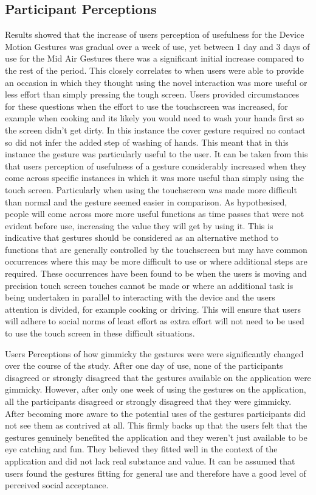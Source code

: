 \documentclass{l4proj}
\begin{document}
\subsection{Participant Perceptions}

Results showed that the increase of users perception of usefulness for the Device Motion Gestures was gradual over a week of use, yet between 1 day and 3 days of use for the Mid Air Gestures there was a significant initial increase compared to the rest of the period. This closely correlates to when users were able to provide an occasion in which they thought using the novel interaction was more useful or less effort than simply pressing the tough screen. Users provided circumstances for these questions when the effort to use the touchscreen was increased, for example when cooking and its likely you would need to wash your hands first so the screen didn't get dirty. In this instance the cover gesture required no contact so did not infer the added step of washing of hands. This meant that in this instance the gesture was particularly useful to the user. It can be taken from this that users perception of usefulness of a gesture considerably increased when they come across specific instances in which it was more useful than simply using the touch screen. Particularly when using the touchscreen was made more difficult than normal and the gesture seemed easier in comparison. As hypothesised, people will come across more more useful functions as time passes that were not evident before use, increasing the value they will get by using it. This is indicative that gestures should be considered as an alternative method to functions that are generally controlled by the touchscreen but may have common occurrences where this may be more difficult to use or where additional steps are required. These occurrences have been found to be when the users is moving and precision touch screen touches cannot be made or where an additional task is being undertaken in parallel to interacting with the device and the users attention is divided, for example cooking or driving. This will ensure that users will adhere to social norms of least effort as extra effort will not need to be used to use the touch screen in these difficult situations.

Users Perceptions of how gimmicky the gestures were were significantly changed over the course of the study. After one day of use, none of the participants disagreed or strongly disagreed that the gestures available on the application were gimmicky. However, after only one week of using the gestures on the application, all the participants disagreed or strongly disagreed that they were gimmicky. After becoming more aware to the potential uses of the gestures participants did not see them as contrived at all. This firmly backs up that the users felt that the gestures genuinely benefited the application and they weren't just available to be eye catching and fun. They believed they fitted well in the context of the application and did not lack real substance and value. It can be assumed that users found the gestures fitting for general use and therefore have a good level of perceived social acceptance.
\end{document}
